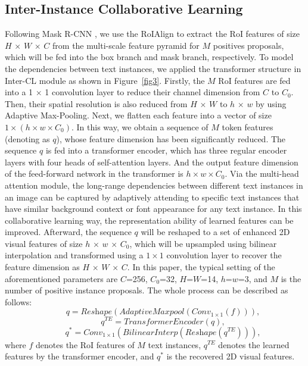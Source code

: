 \subsection{Inter-Instance Collaborative Learning}
\label{subsec:interCL}
Following Mask R-CNN \citep{maskrcnn}, we use the RoIAlign to extract the RoI features of size $H$ $\times$ $W$ $\times$ $C$ from the multi-scale feature pyramid for $M$ positives proposals, which will be fed into the box branch and mask branch, respectively. To model the dependencies between text instances, we applied the transformer structure in Inter-CL module as shown in Figure~\ref{fig3}. Firstly, the $M$ RoI features are fed into a 1 $\times$ 1 convolution layer to reduce their channel dimension from $C$ to $C_{0}$. Then, their spatial resolution is also reduced from $H$ $\times$ $W$ to $h$ $\times$ $w$ by using Adaptive Max-Pooling. Next, we flatten each feature into a vector of size $1 \times (h \times w \times C_{0})$. In this way, we obtain a sequence of $M$ token features (denoting as $q$), whose feature dimension has been significantly reduced. The sequence $q$ is fed into a transformer encoder, which has three regular encoder layers with four heads of self-attention layers. And the output feature dimension of the feed-forward network in the transformer is $h \times w \times C_{0}$. Via the multi-head attention module, the long-range dependencies between different text instances in an image can be captured by adaptively attending to specific text instances that have similar background context or font appearance for any text instance. In this collaborative learning way, the representation ability of learned features can be improved. Afterward, the sequence $q$ will be reshaped to a set of enhanced 2D visual features of size $h$ $\times$ $w$ $\times$ $C_{0}$, which will be upsampled using bilinear interpolation and transformed using a $1 \times 1$ convolution layer to recover the feature dimension as $H$ $\times$ $W$ $\times$ $C$. In this paper, the typical setting of the aforementioned parameters are $C$=256, $C_{0}$=32, $H$=$W$=14, $h$=$w$=3, and $M$ is the number of positive instance proposals. The whole process can be described as follows:
\begin{equation}
\quad\quad \textit{q} = \textit{Reshape}(\textit{AdaptiveMaxpool}(\textit{Conv}_{1\times1}(\textit{f}))),
\label{equ1}
\end{equation}
\begin{equation}
\quad\quad \textit{q}^{\textit{TE}} = \textit{TransformerEncoder}(\textit{q}),
\label{equ2}
\end{equation}
\begin{equation}
\quad\quad \textit{q}^{*} = \textit{Conv}_{1\times1}(\textit{BilinearInterp}(\textit{Reshape}(\textit{q}^{\textit{TE}}))),
\label{equ3}
\end{equation}
where $f$ denotes the RoI features of $M$ text instances, $q^{TE}$ denotes the learned features by the transformer encoder, and $q^{*}$ is the recovered 2D visual features. 

